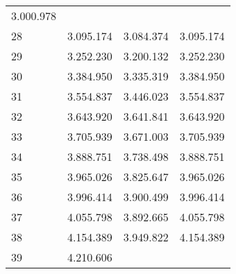 \begin{tabular}{llll}
  \multicolumn{1}{r}{3.000.978} \\
\multicolumn{1}{l}{\hspace{1em}28} &
  \multicolumn{1}{|r}{3.095.174} &
  \multicolumn{1}{r}{3.084.374} &
  \multicolumn{1}{r}{3.095.174} \\
\multicolumn{1}{l}{\hspace{1em}29} &
  \multicolumn{1}{|r}{3.252.230} &
  \multicolumn{1}{r}{3.200.132} &
  \multicolumn{1}{r}{3.252.230} \\
\multicolumn{1}{l}{\hspace{1em}30} &
  \multicolumn{1}{|r}{3.384.950} &
  \multicolumn{1}{r}{3.335.319} &
  \multicolumn{1}{r}{3.384.950} \\
\multicolumn{1}{l}{\hspace{1em}31} &
  \multicolumn{1}{|r}{3.554.837} &
  \multicolumn{1}{r}{3.446.023} &
  \multicolumn{1}{r}{3.554.837} \\
\multicolumn{1}{l}{\hspace{1em}32} &
  \multicolumn{1}{|r}{3.643.920} &
  \multicolumn{1}{r}{3.641.841} &
  \multicolumn{1}{r}{3.643.920} \\
\multicolumn{1}{l}{\hspace{1em}33} &
  \multicolumn{1}{|r}{3.705.939} &
  \multicolumn{1}{r}{3.671.003} &
  \multicolumn{1}{r}{3.705.939} \\
\multicolumn{1}{l}{\hspace{1em}34} &
  \multicolumn{1}{|r}{3.888.751} &
  \multicolumn{1}{r}{3.738.498} &
  \multicolumn{1}{r}{3.888.751} \\
\multicolumn{1}{l}{\hspace{1em}35} &
  \multicolumn{1}{|r}{3.965.026} &
  \multicolumn{1}{r}{3.825.647} &
  \multicolumn{1}{r}{3.965.026} \\
\multicolumn{1}{l}{\hspace{1em}36} &
  \multicolumn{1}{|r}{3.996.414} &
  \multicolumn{1}{r}{3.900.499} &
  \multicolumn{1}{r}{3.996.414} \\
\multicolumn{1}{l}{\hspace{1em}37} &
  \multicolumn{1}{|r}{4.055.798} &
  \multicolumn{1}{r}{3.892.665} &
  \multicolumn{1}{r}{4.055.798} \\
\multicolumn{1}{l}{\hspace{1em}38} &
  \multicolumn{1}{|r}{4.154.389} &
  \multicolumn{1}{r}{3.949.822} &
  \multicolumn{1}{r}{4.154.389} \\
\multicolumn{1}{l}{\hspace{1em}39} &
  \multicolumn{1}{|r}{4.210.606} &

\end{tabular}
